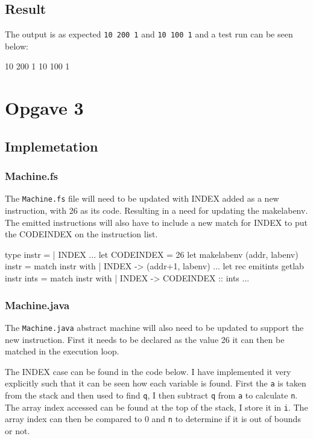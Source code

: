\subsection{Result}
The output is as expected \texttt{10 200 1} and \texttt{10 100 1} and a test run
can be seen below:
\begin{bashcode}
10 200 1 
10 100 1
\end{bashcode}

\section{Opgave 3}
\subsection{Implemetation}
\subsubsection*{Machine.fs}
The \texttt{Machine.fs} file will need to be updated with INDEX added as a new
instruction, with 26 as its code. Resulting in a need for updating the
makelabenv. The emitted instructions will also have to include a new match for
INDEX to put the CODEINDEX on the instruction list.
\begin{fs}
type instr =
    | INDEX 
...
let CODEINDEX  = 26
let makelabenv (addr, labenv) instr = 
    match instr with
    | INDEX          -> (addr+1, labenv)
...
let rec emitints getlab instr ints = 
    match instr with
    | INDEX          -> CODEINDEX  :: ints
...
\end{fs}
\subsubsection*{Machine.java}
The \texttt{Machine.java} abstract machine will also need to be updated to
support the new instruction. First it needs to be declared as the value 26 it
can then be matched in the execution loop.

The INDEX case can be found in the code below. I have implemented it very
explicitly such that it can be seen how each variable is found. First the
\texttt{a} is taken from the stack and then used to find \texttt{q}, I then
subtract \texttt{q} from \texttt{a} to calculate \texttt{n}. The array index
accessed can be found at the top of the stack, I store it in \texttt{i}. The
array index can then be compared to 0 and \texttt{n} to determine if it is out
of bounds or not. 

